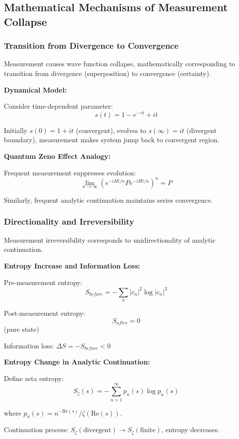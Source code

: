 \documentclass[11pt]{article}
\theoremstyle{plain}
\theoremstyle{definition}
\theoremstyle{remark}
\begin{document}
\subsection{Mathematical Mechanisms of Measurement Collapse}

\subsubsection{Transition from Divergence to Convergence}

Measurement causes wave function collapse, mathematically corresponding to transition from divergence (superposition) to convergence (certainty).

\textbf{Dynamical Model:}

Consider time-dependent parameter:
$$s(t) = 1 - e^{-\gamma t} + it$$

Initially $s(0) = 1 + it$ (convergent), evolves to $s(\infty) = it$ (divergent boundary), measurement makes system jump back to convergent region.

\textbf{Quantum Zeno Effect Analogy:}

Frequent measurement suppresses evolution:
$$\lim_{n \to \infty} \left( e^{-iHt/n} P e^{-iHt/n} \right)^n = P$$

Similarly, frequent analytic continuation maintains series convergence.

\subsubsection{Directionality and Irreversibility}

Measurement irreversibility corresponds to unidirectionality of analytic continuation.

\textbf{Entropy Increase and Information Loss:}

Pre-measurement entropy:
$$S_{before} = -\sum_n |c_n|^2 \log |c_n|^2$$

Post-measurement entropy:
$$S_{after} = 0$$ (pure state)

Information loss: $\Delta S = -S_{before} < 0$

\textbf{Entropy Change in Analytic Continuation:}

Define zeta entropy:
$$S_\zeta(s) = -\sum_{n=1}^{\infty} p_n(s) \log p_n(s)$$

where $p_n(s) = n^{-\text{Re}(s)}/\zeta(\text{Re}(s))$.

Continuation process: $S_\zeta(\text{divergent}) \to S_\zeta(\text{finite})$, entropy decreases.
\end{document}

